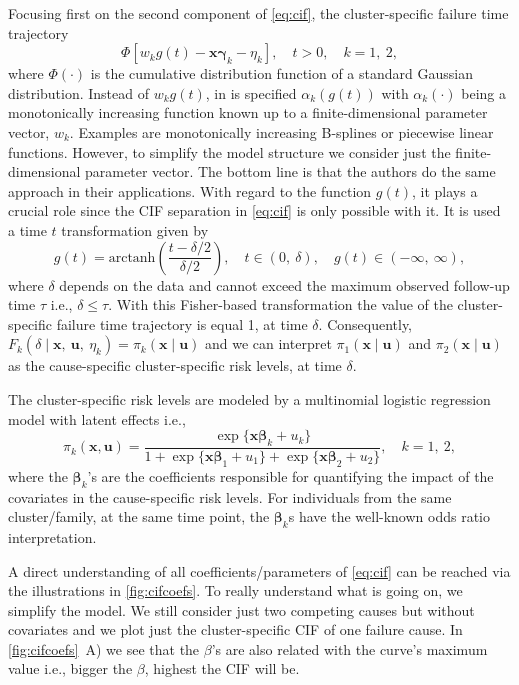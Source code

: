 Focusing first on the second component of \autoref{eq:cif}, the
cluster-specific failure time trajectory
\[
 \Phi[w_{k} g(t) - \bm{x}\bm{\gamma}_{k} - \eta_{k}],
 \quad t > 0, \quad k = 1,~2,
\]
where \(\Phi(\cdot)\) is the cumulative distribution function of a
standard Gaussian distribution. Instead of \(w_{k} g(t)\), in
 is specified \(\alpha_{k}(g(t))\) with
\(\alpha_{k}(\cdot)\) being a monotonically increasing function known up
to a finite-dimensional parameter vector, \(w_{k}\). Examples are
monotonically increasing B-splines or piecewise linear functions.
However, to simplify the model structure we consider just the
finite-dimensional parameter vector. The bottom line is that the authors
do the same approach in their applications. With regard to the function
\(g(t)\), it plays a crucial role since the CIF separation in
\autoref{eq:cif} is only possible with it. It is used a time \(t\)
transformation given by
\[
 g(t) = \text{arctanh}\left(\frac{t - \delta/2}{\delta/2}\right),
 \quad t\in(0,~\delta), \quad g(t)\in(-\infty,~\infty),
\]
where \(\delta\) depends on the data and cannot exceed the maximum
observed follow-up time \(\tau\) i.e., \(\delta \leq \tau\). With this
Fisher-based transformation the value of the cluster-specific failure
time trajectory is equal 1, at time \(\delta\). Consequently, \(F_{k}
(\delta \mid \bm{x},~\bm{u},~\eta_{k}) = \pi_{k}(\bm{x} \mid
\bm{u})\) and we can interpret \(\pi_{1}(\bm{x} \mid \bm{u})\) and
\(\pi_{2}(\bm{x} \mid \bm{u})\) as the cause-specific
cluster-specific risk levels, at time \(\delta\).

The cluster-specific risk levels are modeled by a multinomial logistic
regression model with latent effects i.e.,
\begin{equation}
 \pi_{k}(\bm{x}, \bm{u}) =
 \frac{\exp\{\bm{x}\bm{\beta}_{k} + u_{k}\}}{1 +
  \exp\{\bm{x}\bm{\beta}_{1} + u_{1}\} +
  \exp\{\bm{x}\bm{\beta}_{2} + u_{2}\}}, \quad k = 1,~2,
 \label{eq:risklevel}
\end{equation}
where the \(\bm{\beta}_{k}\)'s are the coefficients responsible for
quantifying the impact of the covariates in the cause-specific risk
levels. For individuals from the same cluster/family, at the same time
point, the \(\bm{\beta}_{k}\)s have the well-known odds ratio
interpretation.

A direct understanding of all coefficients/parameters of
\autoref{eq:cif} can be reached via the illustrations in
\autoref{fig:cifcoefs}. To really understand what is going on, we
simplify the model. We still consider just two competing causes but
without covariates and we plot just the cluster-specific CIF of one
failure cause. In \autoref{fig:cifcoefs}~A) we see that the \(\beta\)'s
are also related with the curve's maximum value i.e., bigger the
\(\beta\), highest the CIF will be.

